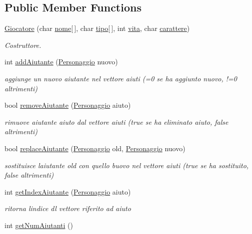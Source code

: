 \subsection*{Public Member Functions}
\begin{DoxyCompactItemize}
\item 
\hyperlink{classGiocatore_ab05bd16f9ab3323dc827c1cb41bf185e}{Giocatore} (char \hyperlink{classPersona_a15d4ded972e8bdd3f02e89c6ccb71b73}{nome}\mbox{[}$\,$\mbox{]}, char \hyperlink{classPersona_ae7069f0467a3b2f1d269c1a143b730eb}{tipo}\mbox{[}$\,$\mbox{]}, int \hyperlink{classPersona_a1e784d3a56cddd6ba8e81387df1efc7b}{vita}, char \hyperlink{classPersona_a1fff44e46be477b79413387307b0aaff}{carattere})
\begin{DoxyCompactList}\small\item\em Costruttore. \end{DoxyCompactList}\item 
int \hyperlink{classGiocatore_a1f05e45f9694771260a7f9aee5265821}{add\+Aiutante} (\hyperlink{classPersonaggio}{Personaggio} nuovo)
\begin{DoxyCompactList}\small\item\em aggiunge un nuovo aiutante nel vettore aiuti (=0 se ha aggiunto nuovo, !=0 altrimenti) \end{DoxyCompactList}\item 
bool \hyperlink{classGiocatore_a703b38cbe7f7657ff98018878c15a961}{remove\+Aiutante} (\hyperlink{classPersonaggio}{Personaggio} aiuto)
\begin{DoxyCompactList}\small\item\em rimuove aiutante aiuto dal vettore aiuti (true se ha eliminato aiuto, false altrimenti) \end{DoxyCompactList}\item 
bool \hyperlink{classGiocatore_ac9f5c0e981bddc91a6b93b4a6fa48e46}{replace\+Aiutante} (\hyperlink{classPersonaggio}{Personaggio} old, \hyperlink{classPersonaggio}{Personaggio} nuovo)
\begin{DoxyCompactList}\small\item\em sostituisce l\textquotesingle{}aiutante old con quello buovo nel vettore aiuti (true se ha sostituito, false altrimenti) \end{DoxyCompactList}\item 
int \hyperlink{classGiocatore_a6ed5fb81af05df594102a6f6d5d7cbd9}{get\+Index\+Aiutante} (\hyperlink{classPersonaggio}{Personaggio} aiuto)
\begin{DoxyCompactList}\small\item\em ritorna l\textquotesingle{}indice dl vettore riferito ad aiuto \end{DoxyCompactList}\item 
\hypertarget{classGiocatore_afd1c7f8a65c41d78c245782459fede3f}{}int \hyperlink{classGiocatore_afd1c7f8a65c41d78c245782459fede3f}{get\+Num\+Aiutanti} ()\label{classGiocatore_afd1c7f8a65c41d78c245782459fede3f}


\end{DoxyCompactItemize}
